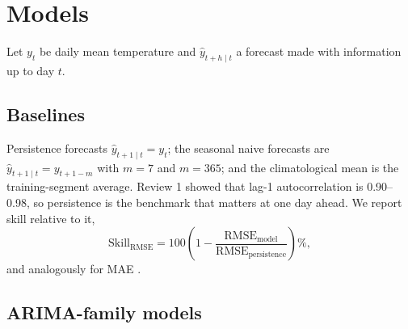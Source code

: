 \documentclass[11pt,a4paper]{article}
\begin{document}
\section{Models}
\label{sec:models}

Let $y_t$ be daily mean temperature and $\hat y_{t+h\mid t}$ a forecast made with information up to day $t$.

\subsection{Baselines}

Persistence forecasts $\hat y_{t+1\mid t} = y_t$; the seasonal naive forecasts are $\hat y_{t+1\mid t} = y_{t+1-m}$ with $m = 7$ and $m = 365$; and the climatological mean is the training-segment average. Review 1 showed that lag-1 autocorrelation is 0.90--0.98, so persistence is the benchmark that matters at one day ahead. We report skill relative to it,
\begin{equation}
  \mathrm{Skill}_{\mathrm{RMSE}} = 100\left(1 - \frac{\mathrm{RMSE}_{\text{model}}}{\mathrm{RMSE}_{\text{persistence}}}\right)\%,
  \label{eq:skill}
\end{equation}
and analogously for MAE \citep{murphy1988skill}.

\subsection{ARIMA-family models}
\end{document}
